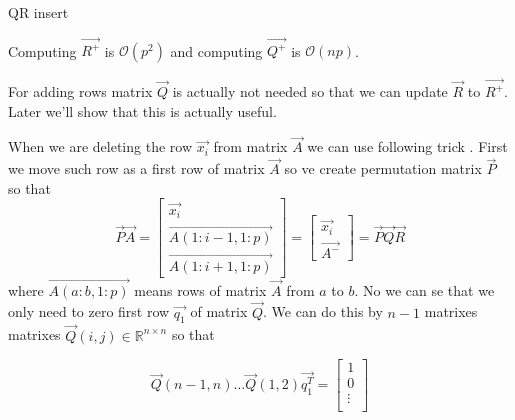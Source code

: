 \begin{algorithm}[H]
	\label{addingrowqr}
	  \caption{QR insert}

	\;
\end{algorithm}

Computing $\vec{R^{+}}$ is $\mathcal{O}(p^2)$ and computing $\vec{Q^{+}}$ is $\mathcal{O}(np)$.

\begin{note} \label{qnotrequired}
	For adding rows matrix $\vec{Q}$ is actually not needed so that we can update $\vec{R}$ to $\vec{R^{+}}$. Later we'll show that this is actually useful. 
\end{note}


When we are deleting the row $\vec{x_i}$ from matrix $\vec{A}$ we can use following trick 
\cite{hammarling2008updatingqr}. First we move such row as a first row of matrix $\vec{A}$ so ve create permutation matrix $\vec{P}$ so that 
\begin{equation}
	\vec{P}\vec{A} = \begin{bmatrix}
		\vec{x_i} \\
		\vec{A(1:i-1 , 1:p)} \\
		\vec{A(1:i+1 , 1:p)} 
	\end{bmatrix}
	= 
	\begin{bmatrix}
		\vec{x_i} \\
		\vec{A^{-}}
	\end{bmatrix}
	= \vec{P}\vec{Q}\vec{R}
\end{equation} 
where $\vec{A(a:b , 1:p)} $ means rows of matrix $\vec{A}$ from $a$ to $b$.
No we can se that we only need to zero first row $\vec{q_1}$ of matrix $\vec{Q}$. We can do this by $n-1$ matrixes matrixes $\vec{Q}(i,j) \in \mathbb{R}^{n \times n}$ so that

\begin{equation}
	\vec{Q}(n-1,n) \ldots \vec{Q}(1,2)\vec{q_1^T} = 	\begin{bmatrix}
		1 \\
		0\\
		\vdots \\
	\end{bmatrix}
\end{equation}

